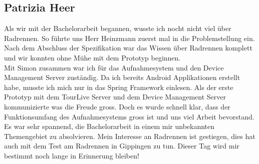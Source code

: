 \subsection{Patrizia Heer}
Als wir mit der Bachelorarbeit begannen, wusste ich nocht nicht viel über Radrennen. So führte uns Herr Heinzmann zuerst mal in die Problemstellung ein. Nach dem Abschluss der Spezifikation war das Wissen über Radrennen komplett und wir konnten ohne Mühe mit dem Prototyp beginnen.\\

Mit Simon zusammen war ich für das Aufnahmesystem und den Device Management Server zuständig. Da ich bereits Android Applikationen erstellt habe, musste ich mich nur in das Spring Framework einlesen. Als der erste Prototyp mit dem TourLive Server und dem Device Management Server kommunizierte was die Freude gross. Doch es wurde schnell klar, dass der Funktionsumfang des Aufnahmesystems gross ist und uns viel Arbeit bevorstand. \\

Es war sehr spannend, die Bachelorarbeit in einem mir unbekannten Themengebiet zu absolvieren. Mein Interesse an Radrennen ist gestiegen, dies hat auch mit dem Test am Radrennen in Gippingen zu tun. Dieser Tag wird mir bestimmt noch lange in Erinnerung bleiben!

